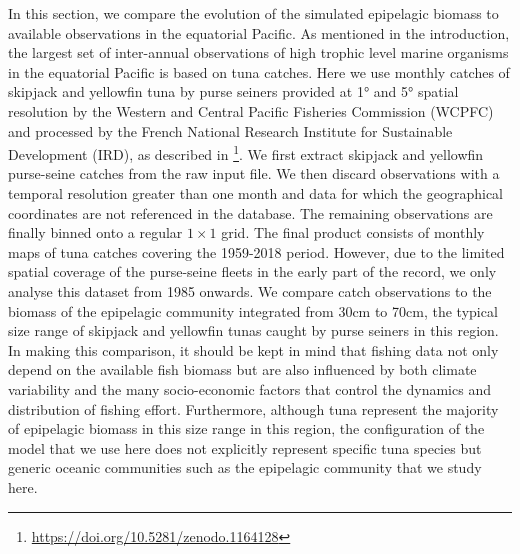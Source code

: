 In this section, we compare the evolution of the simulated epipelagic biomass to available observations in the equatorial Pacific. As mentioned in the introduction, the largest set of inter-annual observations of high trophic level marine organisms in the equatorial Pacific is based on tuna catches. Here we use monthly catches of skipjack and yellowfin tuna by purse seiners provided at 1° and 5° spatial resolution by the Western and Central Pacific Fisheries Commission (WCPFC) and processed by the French National Research Institute for Sustainable Development (IRD), as described in  \cite{taconetGlobalMonthlyCatch2018}\footnote{\url{https://doi.org/10.5281/zenodo.1164128}}. We first extract skipjack and yellowfin purse-seine catches from the raw input file. We then discard observations with a temporal resolution greater than one month and data for which the geographical coordinates are not referenced in the database. The remaining observations are finally binned onto a regular $1 \times 1$ grid. The final product consists of monthly maps of tuna catches covering the 1959-2018 period. However, due to the limited spatial coverage of the purse-seine fleets in the early part of the record, we only analyse this dataset from 1985 onwards. We compare catch observations to the biomass of the epipelagic community integrated from 30cm to 70cm, the typical size range of  skipjack and yellowfin tunas caught by purse seiners in this region. In making this comparison, it should be kept in mind that fishing data not only depend on the available fish biomass but are also influenced by both climate variability and the many socio-economic factors that control the dynamics and distribution of fishing effort. Furthermore, although tuna represent the majority of epipelagic biomass in this size range in this region, the configuration of the model that we use here does not explicitly represent specific tuna species but generic oceanic communities such as the epipelagic community that we study here.

